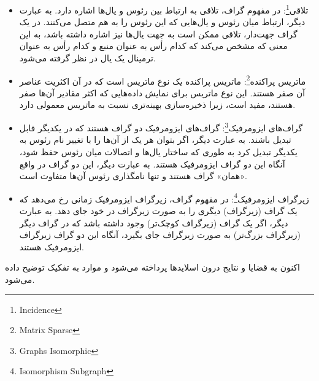 \documentclass[a4paper,10pt]{article}
\begin{document}
\begin{itemize}
        \item تلاقی\footnote{\hspace{2pt}Incidence}: در مفهوم گراف، تلاقی به ارتباط بین رئوس و یال‌ها اشاره دارد. به عبارت دیگر، ارتباط میان رئوس و یال‌هایی که این رئوس را به هم متصل می‌کنند. در یک گراف جهت‌دار، تلاقی ممکن است به جهت یال‌ها نیز اشاره داشته باشد، به این معنی که مشخص می‌کند که کدام رأس به عنوان منبع و کدام رأس به عنوان ترمینال یک یال در نظر گرفته می‌شود.
        
        \item ماتریس پراکنده\footnote{\hspace{2pt}Matrix Sparse}: ماتریس پراکنده یک نوع ماتریس است که در آن اکثریت عناصر آن صفر هستند. این نوع ماتریس برای نمایش داده‌هایی که اکثر مقادیر آن‌ها صفر هستند، مفید است، زیرا ذخیره‌سازی بهینه‌تری نسبت به ماتریس معمولی دارد.
        
        \item گراف‌های ایزومرفیک\footnote{\hspace{2pt}Graphs Isomorphic}: گراف‌های ایزومرفیک دو گراف هستند که در یکدیگر قابل تبدیل باشند. به عبارت دیگر، اگر بتوان هر یک از آن‌ها را با تغییر نام رئوس به یکدیگر تبدیل کرد به طوری که ساختار یال‌ها و اتصالات میان رئوس حفظ شود، آنگاه این دو گراف ایزومرفیک هستند. به عبارت دیگر، این دو گراف در واقع «همان» گراف هستند و تنها نامگذاری رئوس آن‌ها متفاوت است.
        
        \item زیرگراف ایزومرفیک\footnote{\hspace{2pt}Isomorphism Subgraph}: در مفهوم گراف، زیرگراف ایزومرفیک زمانی رخ می‌دهد که یک گراف (زیرگراف) دیگری را به صورت زیرگراف در خود جای دهد. به عبارت دیگر، اگر یک گراف (زیرگراف کوچک‌تر) وجود داشته باشد که در گراف دیگر (زیرگراف بزرگ‌تر) به صورت زیرگراف جای بگیرد، آنگاه این دو گراف زیرگراف ایزومرفیک هستند.

    \end{itemize}

    اکنون به قضایا و نتایج درون اسلایدها پرداخته می‌شود و موارد به تفکیک توضیح داده می‌شود.
\end{document}
